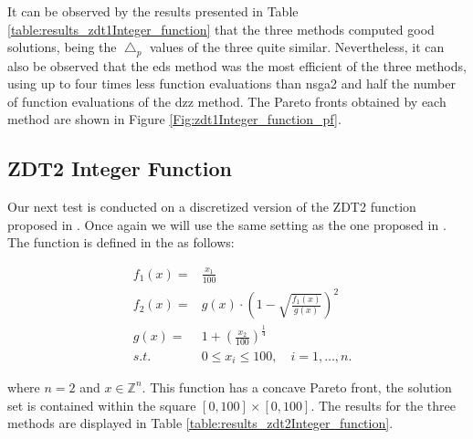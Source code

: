 It can be observed by the results presented in Table \ref{table:results_zdt1Integer_function} that the three methods computed good solutions, being the $\bigtriangleup_p$ values of the three quite similar. Nevertheless, it can also be observed that the \gls{eds} method was the most efficient of the three methods, using up to four times less function evaluations than \gls{nsga2} and half the number of function evaluations of the \gls{dzz} method. The Pareto fronts obtained by each method are shown in Figure \ref{Fig:zdt1Integer_function_pf}.

\begin{comment}

\begin{figure}[H]
   \centering
	\hspace*{-0.5in}
    \subfloat[EDS]{%
      \texttt{[image: img/fronts/pf\_ijocCase1\_eds.png]}
    }
    \subfloat[NSGA-II]{%
      \texttt{[image: img/fronts/pf\_ijocCase1\_ga.png]}
    }
    \subfloat[DZZ]{%
      \texttt{[image: img/fronts/pf\_ijocCase1\_dzz.png]}
    }
    \caption{Pareto fronts of the ZDT1 integer function computed by the different methods}
    \label{Fig:zdt1Integer_function_pf}
\end{figure}

\end{comment}

\subsection{ZDT2 Integer Function}

Our next test is conducted on a discretized version of the ZDT2 function proposed in \cite{zigzag_discrete}. Once again we will use the same setting as the one proposed in \cite{zigzag_discrete}. The function is defined in the as follows:

\begin{eqnarray}
& f_1(x) = & \frac{x_1}{100} \nonumber \\
& f_2(x) = & g(x) \cdot \left(1 - \sqrt{\frac{f_1(x)}{g(x)}} \right)^2 \\
& g(x) = & 1 + \left(\frac{x_2 }{100} \right)^\frac{1}{4} \nonumber \\
& s.t. & 0 \leq x_i \leq 100, \quad i = 1, \ldots, n. \nonumber
\end{eqnarray}

where $n = 2$ and $x \in \mathbb{Z}^n$. This function has a concave Pareto front, the solution set is contained within the square $[0,100] \times [0,100]$. The results for the three methods are displayed in Table \ref{table:results_zdt2Integer_function}.


